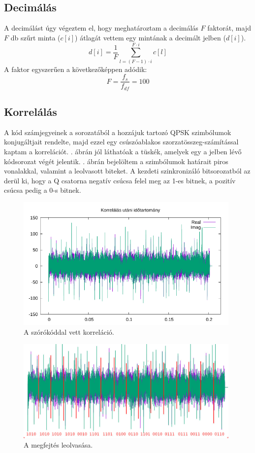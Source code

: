 	\subsection{Decimálás}
		A decimálást úgy végeztem el, hogy meghatároztam a decimálás $F$ faktorát, majd $F$ db szűrt minta  ($c[i]$) átlagát vettem egy mintának a decimált jelben ($d[i]$).
		\begin{equation}
			d[i] = \dfrac{1}{F}\sum_{l=(F-1)\cdot i}^{F\cdot i}c[l]
		\end{equation}
		A faktor egyszerűen a következőképpen adódik:
		\begin{equation}
			F = \dfrac{f_s}{f_{df}} = 100
		\end{equation}
	\subsection{Korrelálás}
		A kód számjegyeinek a sorozatából a hozzájuk tartozó QPSK szimbólumok konjugáltjait rendelte, majd ezzel egy csúszóablakos szorzatösszeg-számítással kaptam a korrelációt. . ábrán jól láthatóak a tüskék, amelyek egy a jelben lévő kódsorozat végét jelentik. . ábrán bejelöltem a szimbólumok határait piros vonalakkal, valamint a leolvasott biteket. A kezdeti szinkronizáló bitsorozatból az derül ki, hogy a Q csatorna negatív csúcsa felel meg az 1-es bitnek, a pozitív csúcsa pedig a 0-s bitnek.
		\begin{figure}[h!]
			\centering
			\includegraphics[width=0.98\textwidth]{kep/correlated_samples.pdf}
			\caption{A szórókóddal vett korreláció.}
			\label{fig:correlated}
		\end{figure}
		\begin{figure}[h!]
			\centering
			\includegraphics[width=0.98\textwidth]{kep/megfejtes.jpg}
			\caption{A megfejtés leolvasása.}
			\label{fig:megfejtes}
		\end{figure}

